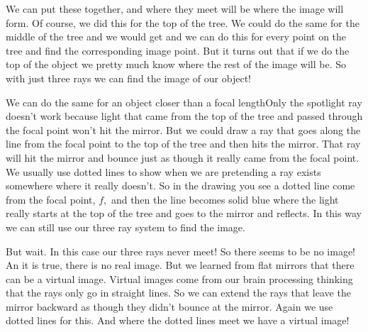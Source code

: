 \documentclass{article}
\begin{document}
We can put these together, and where they meet will be where the image will
form.  Of course, we did this for the
top of the tree. We could do the same for the middle of the tree and we
would get and we can do this for every
point on the tree and find the corresponding image point. But it turns out
that if we do the top of the object we pretty much know where the rest of
the image will be. So with just three rays we can find the image of our
object!

We can do the same for an object closer than a focal lengthOnly the spotlight ray doesn't
work because light that came from the top of the tree and passed through the
focal point won't hit the mirror. But we could draw a ray that goes along
the line from the focal point to the top of the tree and then hits the
mirror. That ray will hit the mirror and bounce just as though it really
came from the focal point. We usually use dotted lines to show when we are
pretending a ray exists somewhere where it really doesn't. So in the drawing
you see a dotted line come from the focal point, $f,$ and then the line
becomes solid blue where the light really starts at the top of the tree and
goes to the mirror and reflects. In this way we can still use our three ray
system to find the image.

But wait. In this case our three rays never meet! So there seems to be no
image! An it is true, there is no real image. But we learned from flat
mirrors that there can be a virtual image. Virtual images come from our
brain processing thinking that the rays only go in straight lines. So we can
extend the rays that leave the mirror backward as though they didn't bounce
at the mirror. Again we use dotted lines for this. And where the dotted
lines meet we have a virtual image!
\end{document}
